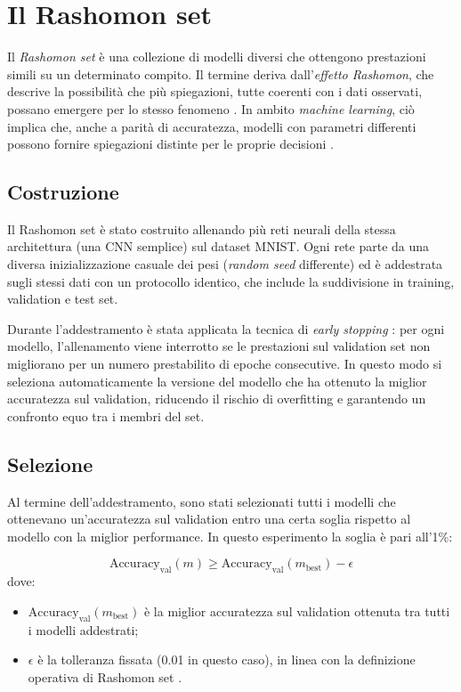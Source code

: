 \documentclass{article}
\begin{document}
\section{Il Rashomon set}

Il \emph{Rashomon set} è una collezione di modelli diversi che ottengono
prestazioni simili su un determinato compito. Il termine deriva
dall’\emph{effetto Rashomon}, che descrive la possibilità che più spiegazioni,
tutte coerenti con i dati osservati, possano emergere per lo stesso fenomeno
\citep{mueller2023rashomon}. In ambito \emph{machine learning}, ciò implica
che, anche a parità di accuratezza, modelli con parametri differenti possono
fornire spiegazioni distinte per le proprie decisioni
\citep{fisher2019all,semenova2019existence}.

\subsection{Costruzione}
Il Rashomon set è stato costruito allenando più reti neurali della stessa
architettura (una CNN semplice) sul dataset MNIST. Ogni rete parte da una
diversa inizializzazione casuale dei pesi (\emph{random seed} differente) ed è
addestrata sugli stessi dati con un protocollo identico, che include la
suddivisione in training, validation e test set.

Durante l’addestramento è stata applicata la tecnica di \emph{early stopping}
\citep{prechelt1998early}: per ogni modello, l’allenamento viene interrotto se
le prestazioni sul validation set non migliorano per un numero prestabilito di
epoche consecutive. In questo modo si seleziona automaticamente la versione del
modello che ha ottenuto la miglior accuratezza sul validation, riducendo il
rischio di overfitting e garantendo un confronto equo tra i membri del set.

\subsection{Selezione}
Al termine dell’addestramento, sono stati selezionati tutti i modelli che
ottenevano un’accuratezza sul validation entro una certa soglia rispetto al
modello con la miglior performance. In questo esperimento la soglia è pari
all’1\%:

\[
      \mathrm{Accuracy}_{\mathrm{val}}(m) \geq \mathrm{Accuracy}_{\mathrm{val}}(m_{\mathrm{best}}) - \epsilon
\]
dove:
\begin{itemize}
      \item $\mathrm{Accuracy}_{\mathrm{val}}(m_{\mathrm{best}})$ è la miglior accuratezza sul validation ottenuta tra tutti i modelli addestrati;
      \item $\epsilon$ è la tolleranza fissata (0.01 in questo caso), in linea con la definizione operativa di Rashomon set \citep{fisher2019all}.
\end{itemize}
\end{document}
